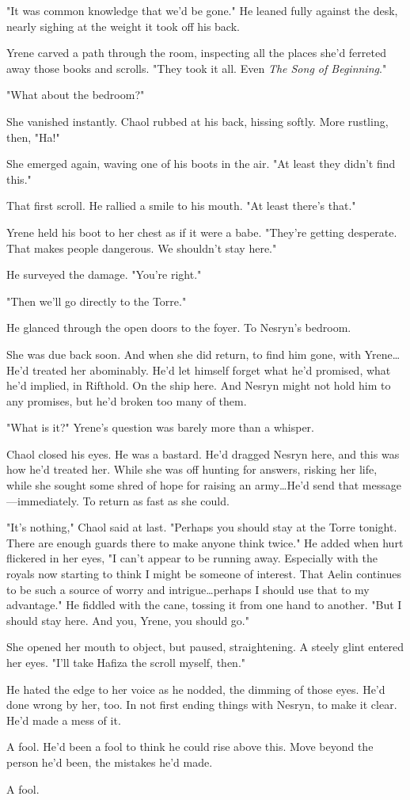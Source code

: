 "It was common knowledge that we'd be gone."
He leaned fully against the desk, nearly sighing at the weight it took off his back.

Yrene carved a path through the room, inspecting all the places she'd ferreted away those books and scrolls.
"They took it all.
Even \emph{The Song of Beginning}."

"What about the bedroom?"

She vanished instantly.
Chaol rubbed at his back, hissing softly.
More rustling, then, "Ha!"

She emerged again, waving one of his boots in the air.
"At least they didn't find this."

That first scroll.
He rallied a smile to his mouth.
"At least there's that."

Yrene held his boot to her chest as if it were a babe.
"They're getting desperate.
That makes people dangerous.
We shouldn't stay here."

He surveyed the damage.
"You're right."

"Then we'll go directly to the Torre."

He glanced through the open doors to the foyer.
To Nesryn's bedroom.

She was due back soon.
And when she did return, to find him gone, with Yrene\ldots He'd treated her abominably.
He'd let himself forget what he'd promised, what he'd implied, in Rifthold.
On the ship here.
And Nesryn might not hold him to any promises, but he'd broken too many of them.

"What is it?"
Yrene's question was barely more than a whisper.

Chaol closed his eyes.
He was a bastard.
He'd dragged Nesryn here, and this was how he'd treated her.
While she was off hunting for answers, risking her life, while she sought some shred of hope for raising an army\ldots He'd send that message---immediately.
To return as fast as she could.

"It's nothing," Chaol said at last.
"Perhaps you should stay at the Torre tonight.
There are enough guards there to make anyone think twice."
He added when hurt flickered in her eyes, "I can't appear to be running away.
Especially with the royals now starting to think I might be someone of interest.
That Aelin continues to be such a source of worry and intrigue\ldots perhaps I should use that to my advantage."
He fiddled with the cane, tossing it from one hand to another.
"But I should stay here.
And you, Yrene, you should go."

She opened her mouth to object, but paused, straightening.
A steely glint entered her eyes.
"I'll take Hafiza the scroll myself, then."

He hated the edge to her voice as he nodded, the dimming of those eyes.
He'd done wrong by her, too.
In not first ending things with Nesryn, to make it clear.
He'd made a mess of it.

A fool.
He'd been a fool to think he could rise above this.
Move beyond the person he'd been, the mistakes he'd made.

A fool.

